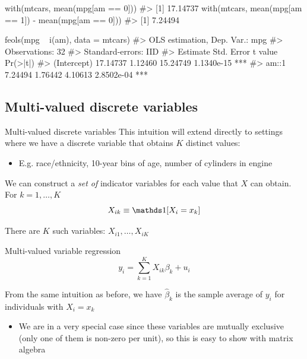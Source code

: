 \documentclass[aspectratio=169,t,11pt,table]{beamer}
\begin{document}
\begin{frame}[fragile]{}
  \bigskip
  \begin{codeblock}
with(mtcars, mean(mpg[am == 0]))
#> [1] 17.14737
with(mtcars, mean(mpg[am == 1]) - mean(mpg[am == 0]))
#> [1] 7.24494

feols(mpg ~ i(am), data = mtcars)
#> OLS estimation, Dep. Var.: mpg
#> Observations: 32
#> Standard-errors: IID 
#>             Estimate Std. Error  t value   Pr(>|t|)    
#> (Intercept) 17.14737    1.12460 15.24749 1.1340e-15 ***
#> am::1        7.24494    1.76442  4.10613 2.8502e-04 ***
  \end{codeblock}
\end{frame}

\subsection{Multi-valued discrete variables}

\begin{frame}{Multi-valued discrete variables}
  This intuition will extend directly to settings where we have a discrete variable that obtains $K$ distinct values:
  \begin{itemize}
    \item E.g. race/ethnicity, 10-year bins of age, number of cylinders in engine
  \end{itemize}

  \pause
  \bigskip
  We can construct a \emph{set of} indicator variables for each value that $X$ can obtain. For $k = 1, \dots, K$
  $$
    X_{ik} \equiv \one{X_i = x_k}
  $$

  \bigskip
  There are $K$ such variables: $X_{i1}, \dots, X_{iK}$
\end{frame}

\begin{frame}{Multi-valued variable regression}
  \vspace*{-\bigskipamount}
  $$
    y_i = \sum_{k=1}^K X_{ik} \beta_k + u_i
  $$

  \bigskip
  From the same intuition as before, we have $\hat{\beta}_k$ is the sample average of $y_i$ for individuals with $X_i = x_k$
  \begin{itemize}
    \item We are in a very special case since these variables are mutually exclusive (only one of them is non-zero per unit), so this is easy to show with matrix algebra
  \end{itemize}
\end{frame}
\end{document}
